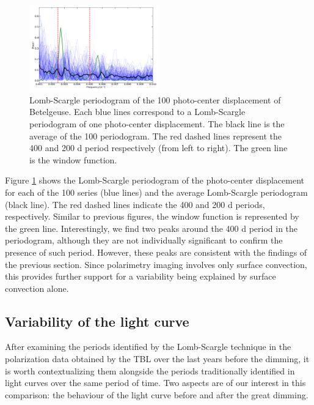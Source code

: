 \documentclass{aa}
\begin{document}
\begin{figure}[!h]
    \centering
    \includegraphics[width=0.5\textwidth]{Lomb-Scargle Photo-center.pdf}
    \caption{Lomb-Scargle periodogram of the 100 photo-center displacement of Betelgeuse. Each blue lines correspond to a Lomb-Scargle periodogram of one photo-center
     displacement. The black line is the average of the 100 periodogram. The red dashed lines represent the 400 and 200 d period respectively 
     (from left to right). The green line is the window function.}
    \label{LS photocenter}
\end{figure}

Figure \ref{LS photocenter} shows the Lomb-Scargle periodogram of the photo-center displacement for each of the 100 series (blue lines) and the average Lomb-Scargle periodogram (black line). 
The red dashed lines indicate the 400 and 
200 d periods, respectively. Similar to previous figures, the window function is represented by the green line. Interestingly, we find two peaks around the 400 d period in the periodogram, although they are not individually significant to confirm the presence of such period. However, these peaks are consistent with the findings of the previous section. Since polarimetry imaging involves only surface convection, this provides further support for a variability being explained by surface convection alone.


\subsection{Variability of the light curve}

After examining the periods identified by the Lomb-Scargle technique in the polarization data obtained by the TBL over the last years before the dimming, it is worth contextualizing them alongside the periods traditionally identified in light curves over the same period of time. Two aspects 
are of our interest in this comparison: the behaviour of the light curve before and after the great dimming.
\end{document}
